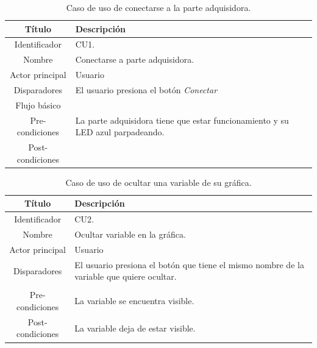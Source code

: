 \begin{table}[htpb]
	\centering
	\caption{Caso de uso de conectarse a la parte adquisidora.}
	\centering
	\begin{tabular}{c p{}}    
		\toprule
		\textbf{Título }     & \textbf{Descripción} \\
		\midrule
		Identificador		&  CU1. \\
		Nombre				&   Conectarse a parte adquisidora. \\
		Actor principal		&   Usuario \\
		Disparadores		&   El usuario presiona el botón \textit{Conectar} \\
		Flujo básico		&   \\
		Pre-condiciones		&   La parte adquisidora tiene que estar funcionamiento y su LED azul parpadeando. \\
		Post-condiciones	&    \\
		\bottomrule
	\end{tabular}
\label{tab:caso-conectar}
\end{table}

\begin{table}[htpb]
	\centering
	\caption{Caso de uso de ocultar una variable de su gráfica.}
	\centering
	\begin{tabular}{c p{}}    
		\toprule
		\textbf{Título }     & \textbf{Descripción} \\
		\midrule
		Identificador		&  CU2. \\
		Nombre				&   Ocultar variable en la gráfica. \\
		Actor principal		&   Usuario \\
		Disparadores		&   El usuario presiona el botón que tiene el mismo nombre de la variable que quiere ocultar. \\
\\
		Pre-condiciones		&   La variable se encuentra visible. \\
		Post-condiciones	&   La variable deja de estar visible.\\
		\bottomrule
	\end{tabular}
\label{tab:caso-ocultar}
\end{table}

